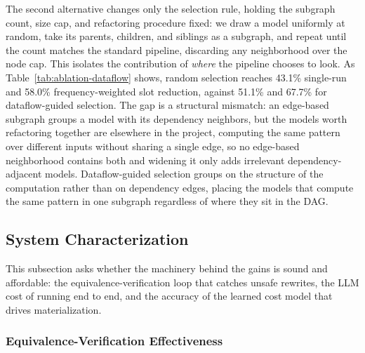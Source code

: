  The second alternative changes only the selection rule, holding the subgraph count, size cap, and refactoring procedure fixed: we draw a model uniformly at random, take its parents, children, and siblings as a subgraph, and repeat until the count matches the standard pipeline, discarding any neighborhood over the node cap. This isolates the contribution of \emph{where} the pipeline chooses to look. As Table~\ref{tab:ablation-dataflow} shows, random selection reaches 43.1\% single-run and 58.0\% frequency-weighted slot reduction, against 51.1\% and 67.7\% for dataflow-guided selection. The gap is a structural mismatch: an edge-based subgraph groups a model with its dependency neighbors, but the models worth refactoring together are elsewhere in the project, computing the same pattern over different inputs without sharing a single edge, so no edge-based neighborhood contains both and widening it only adds irrelevant dependency-adjacent models. Dataflow-guided selection groups on the structure of the computation rather than on dependency edges, placing the models that compute the same pattern in one subgraph regardless of where they sit in the DAG.
 
 








\subsection{System Characterization}
\label{sec:eval-system}

This subsection asks whether the machinery behind the gains is sound and affordable: the equivalence-verification loop that catches unsafe rewrites, the LLM cost of running \tool{} end to end, and the accuracy of the learned cost model that drives materialization.

\subsubsection{Equivalence-Verification Effectiveness}
\label{sec:eval-verification}

